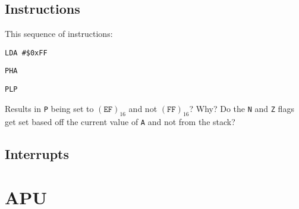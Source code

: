 \documentclass[10pt, draft]{book}
\begin{document}
  \section{Instructions}

  This sequence of instructions:

  \texttt{LDA \#\$0xFF}

  \texttt{PHA}

  \texttt{PLP}

  \noindent Results in \texttt{P} being set to $(\texttt{EF})_{16}$ and not
  $(\texttt{FF})_{16}$? Why? Do the \texttt{N} and \texttt{Z} flags get set
  based off the current value of \texttt{A} and not from the stack?

  \section{Interrupts}

  

  \chapter{APU}
\end{document}
